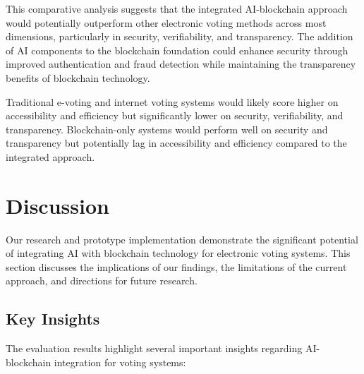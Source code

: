 \documentclass[conference]{IEEEtran}
\begin{document}
This comparative analysis suggests that the integrated AI-blockchain approach would potentially outperform other electronic voting methods across most dimensions, particularly in security, verifiability, and transparency. The addition of AI components to the blockchain foundation could enhance security through improved authentication and fraud detection while maintaining the transparency benefits of blockchain technology.

Traditional e-voting and internet voting systems would likely score higher on accessibility and efficiency but significantly lower on security, verifiability, and transparency. Blockchain-only systems would perform well on security and transparency but potentially lag in accessibility and efficiency compared to the integrated approach.

\section{Discussion}
Our research and prototype implementation demonstrate the significant potential of integrating AI with blockchain technology for electronic voting systems. This section discusses the implications of our findings, the limitations of the current approach, and directions for future research.

\subsection{Key Insights}
The evaluation results highlight several important insights regarding AI-blockchain integration for voting systems:
\end{document}
